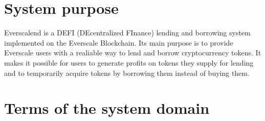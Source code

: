 

\section{System purpose}

Everscalend is a DEFI (DEcentralized FInance) lending and borrowing system implemented on the Everscale Blockchain. Its main purpose is to provide Everscale users with a realiable way to lend and borrow cryptocurrency tokens. It makes it possible for users to generate profits on tokens they supply for lending and to temporarily acquire tokens by borrowing them instead of buying them.

\section{Terms of the system domain}

